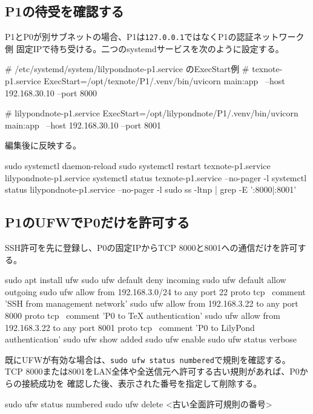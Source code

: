 \documentclass[uplatex,a4paper,11pt]{jsarticle}
\begin{document}
\subsection{P1の待受を確認する}

P1とP0が別サブネットの場合、P1は\texttt{127.0.0.1}ではなくP1の認証ネットワーク側
固定IPで待ち受ける。二つのsystemdサービスを次のように設定する。

\begin{command}
# /etc/systemd/system/lilypondnote-p1.service のExecStart例
# texnote-p1.service
ExecStart=/opt/texnote/P1/.venv/bin/uvicorn main:app \
  --host 192.168.30.10 --port 8000

# lilypondnote-p1.service
ExecStart=/opt/lilypondnote/P1/.venv/bin/uvicorn main:app \
  --host 192.168.30.10 --port 8001
\end{command}

編集後に反映する。

\begin{command}
sudo systemctl daemon-reload
sudo systemctl restart texnote-p1.service lilypondnote-p1.service
systemctl status texnote-p1.service --no-pager -l
systemctl status lilypondnote-p1.service --no-pager -l
sudo ss -ltnp | grep -E ':8000|:8001'
\end{command}

\subsection{P1のUFWでP0だけを許可する}

SSH許可を先に登録し、P0の固定IPからTCP 8000と8001への通信だけを許可する。

\begin{command}
sudo apt install ufw
sudo ufw default deny incoming
sudo ufw default allow outgoing
sudo ufw allow from 192.168.3.0/24 to any port 22 proto tcp \
  comment 'SSH from management network'
sudo ufw allow from 192.168.3.22 to any port 8000 proto tcp \
  comment 'P0 to TeX authentication'
sudo ufw allow from 192.168.3.22 to any port 8001 proto tcp \
  comment 'P0 to LilyPond authentication'
sudo ufw show added
sudo ufw enable
sudo ufw status verbose
\end{command}

既にUFWが有効な場合は、\texttt{sudo ufw status numbered}で規則を確認する。
TCP 8000または8001をLAN全体や全送信元へ許可する古い規則があれば、P0からの接続成功を
確認した後、表示された番号を指定して削除する。

\begin{command}
sudo ufw status numbered
sudo ufw delete <古い全面許可規則の番号>
\end{command}
\end{document}
